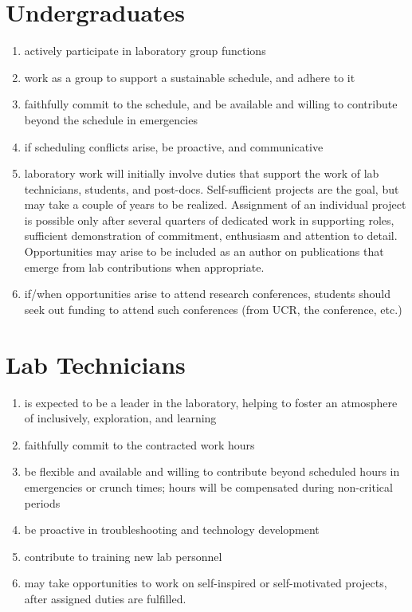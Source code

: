 \documentclass[12pt]{article}
\begin{document}
\section{Undergraduates}
\begin{enumerate}
\item actively participate in laboratory group functions
\item work as a group to support a sustainable schedule, and adhere to
  it
\item faithfully commit to the schedule, and be available and willing
  to contribute beyond the schedule in emergencies
\item if scheduling conflicts arise, be proactive, and communicative
\item laboratory work will initially involve duties that support the
  work of lab technicians, students, and post-docs. Self-sufficient
  projects are the goal, but may take a couple of years to be
  realized. Assignment of an individual project is possible only after
  several quarters of dedicated work in supporting roles, sufficient
  demonstration of commitment, enthusiasm and attention to
  detail. Opportunities may arise to be included as an author on
  publications that emerge from lab contributions when appropriate.
\item if/when opportunities arise to attend research conferences, students
  should seek out funding to attend such conferences (from UCR, the
  conference, etc.)
\end{enumerate}

\section{Lab Technicians}
\begin{enumerate}
\item is expected to be a leader in the laboratory, helping to foster
  an atmosphere of inclusively, exploration, and learning
\item faithfully commit to the contracted work hours
\item be flexible and available and willing to contribute beyond
  scheduled hours in emergencies or crunch times; hours will be
  compensated during non-critical periods
\item be proactive in troubleshooting and technology development
\item contribute to training new lab personnel
\item may take opportunities to work on self-inspired or self-motivated
  projects, after assigned duties are fulfilled.
\end{enumerate}
\end{document}
